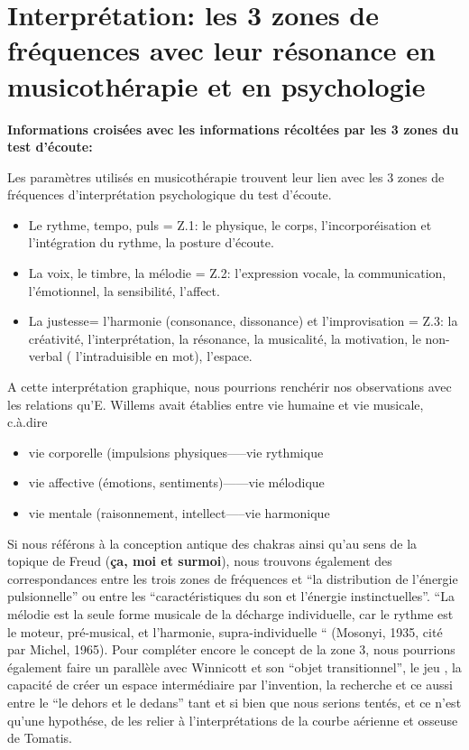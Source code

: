 \section{Interprétation: les 3 zones de fréquences avec leur résonance en musicothérapie et en
  psychologie}


	\textbf{Informations croisées avec les informations récoltées par les 3 
          zones du test d'écoute:}
          
Les paramètres utilisés en musicothérapie trouvent leur lien avec les
3 zones de fréquences d'interprétation psychologique du test d'écoute.

\begin{itemize}
 \item Le rythme, tempo, puls  =  Z.1: le physique, le corps, l'incorporéisation et
l'intégration du rythme,
la posture d'écoute.

\item La voix, le timbre, la mélodie =  Z.2:  l'expression vocale, la communication,
l'émotionnel, la sensibilité, l'affect.

\item La justesse= l'harmonie (consonance, dissonance) et l'improvisation = Z.3:  la créativité, l'interprétation, la
résonance, la musicalité, la motivation, le non-verbal (
l'intraduisible en mot), l'espace.

\end{itemize}
A cette interprétation graphique, nous pourrions renchérir nos
observations avec les relations
qu'E.
Willems  avait établies entre vie humaine et vie musicale, c.à.dire
\begin{itemize}
  \item vie corporelle (impulsions physiques-----vie rythmique
  \item vie affective (émotions, sentiments)------vie mélodique
    \item vie mentale (raisonnement, intellect-----vie harmonique
\end{itemize}

Si nous référons à la conception antique des chakras ainsi qu'au sens de la
topique de Freud (\textbf{ça, moi et surmoi}), nous trouvons également des correspondances
entre les trois zones de 
fréquences et ``la distribution de l'énergie pulsionnelle'' ou entre
les 
``caractéristiques du son et l'énergie instinctuelles''. \autocite[ch. 13]{auriol:cle} 
``La mélodie est la seule forme musicale de la décharge individuelle, car le rythme est le moteur, pré-musical, et l'harmonie, supra-individuelle `` (Mosonyi, 1935, cité par Michel, 1965).
Pour compléter encore le concept de la zone 3, nous pourrions
également faire un parallèle avec Winnicott et son ``objet
transitionnel'', le jeu , la capacité de créer un espace
intermédiaire par l'invention, la recherche et ce aussi entre le ``le
dehors et le dedans'' tant et si bien que nous serions tentés, et ce n'est qu'une
hypothése, de les relier à l'interprétations de la courbe aérienne et osseuse de Tomatis. 
 
